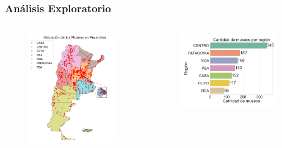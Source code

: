 \documentclass[10pt]{beamer}
\begin{document}
\begin{frame}
  \frametitle{Análisis Exploratorio}

  \begin{columns}
      \begin{figure}
        \vspace{-2.75em}
        \includegraphics[width=\textwidth]{museos_datosabiertos.png}
      \end{figure}
    
      \begin{figure}
        \vspace{-1.5em}
        \includegraphics[width=0.9\textwidth]{cantidad_museos.png}
      \end{figure}


\end{columns}
\end{frame}
\end{document}
